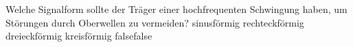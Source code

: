     {Welche Signalform sollte der Träger einer hochfrequenten Schwingung haben, um Störungen durch Oberwellen zu vermeiden?}
    {sinusförmig}
    {rechteckförmig}
    {dreieckförmig}
    {kreisförmig}
    {false}{false}